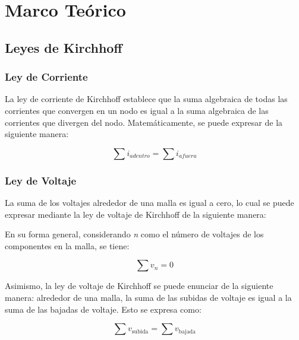 \documentclass[twocolumn, 12pt]{article}
\begin{document}
\section{Marco Teórico}

\subsection{Leyes de Kirchhoff} \nocite{KhanAcademy__Kirchhoff}

\subsubsection{Ley de Corriente}

La ley de corriente de Kirchhoff establece que la suma
algebraica de todas las corrientes que convergen en un nodo
es igual a la suma algebraica de las corrientes que
divergen del nodo. Matemáticamente, se puede expresar de la
siguiente manera:

{\large
\begin{equation}
    \sum i_{adentro} = \sum i_{afuera}
\end{equation}
}

\subsubsection{Ley de Voltaje}

La suma de los voltajes alrededor de una malla es igual a
cero, lo cual se puede expresar mediante la ley de voltaje
de Kirchhoff de la siguiente manera:

En su forma general, considerando \textit{n} como el número
de voltajes de los componentes en la malla, se tiene:

{\large
\begin{equation}
    \sum v_n = 0
\end{equation}
}

Asimismo, la ley de voltaje de Kirchhoff se puede enunciar
de la siguiente manera: alrededor de una malla, la suma de
las subidas de voltaje es igual a la suma de las bajadas de
voltaje. Esto se expresa como:

{\large
\begin{equation}
    \sum v_{\text{subida}} = \sum v_{\text{bajada}}
\end{equation}
}
\end{document}
